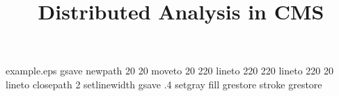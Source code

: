 %
%
%
%
%
\begin{filecontents*}{example.eps}
gsave
newpath
  20 20 moveto
  20 220 lineto
  220 220 lineto
  220 20 lineto
closepath
2 setlinewidth
gsave
  .4 setgray fill
grestore
stroke
grestore
\end{filecontents*}
%
\documentclass{svjour3}                     %
%
\smartqed  %
%
\usepackage{graphicx}
%
%
%
%
%


\title{Distributed Analysis in CMS}

